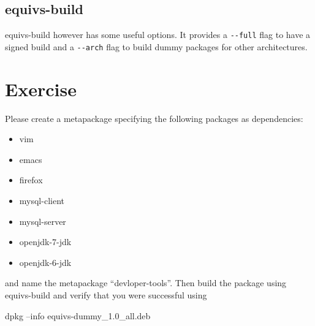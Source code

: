\documentclass[]{article}
\newenvironment{Shaded}{}{}
\newcommand{\KeywordTok}[1]{\textcolor[rgb]{0.00,0.44,0.13}{\textbf{{#1}}}}
\newcommand{\StringTok}[1]{\textcolor[rgb]{0.25,0.44,0.63}{{#1}}}
\newcommand{\NormalTok}[1]{{#1}}
\begin{document}
\subsection{equivs-build}

\begin{Shaded}
\end{Shaded}
equivs-build however has some useful options. It provides a
\texttt{-{}-full} flag to have a signed build and a \texttt{-{}-arch}
flag to build dummy packages for other architectures.

\section{Exercise}

Please create a metapackage specifying the following packages as
dependencies:

\begin{itemize}
\item
  vim
\item
  emacs
\item
  firefox
\item
  mysql-client
\item
  mysql-server
\item
  openjdk-7-jdk
\item
  openjdk-6-jdk
\end{itemize}
and name the metapackage ``devloper-tools''. Then build the package
using equivs-build and verify that you were successful using

\begin{Shaded}
\begin{Highlighting}[]
\NormalTok{dpkg --info equivs-dummy_1.0_all.deb}
\end{Highlighting}
\end{Shaded}
\end{document}
